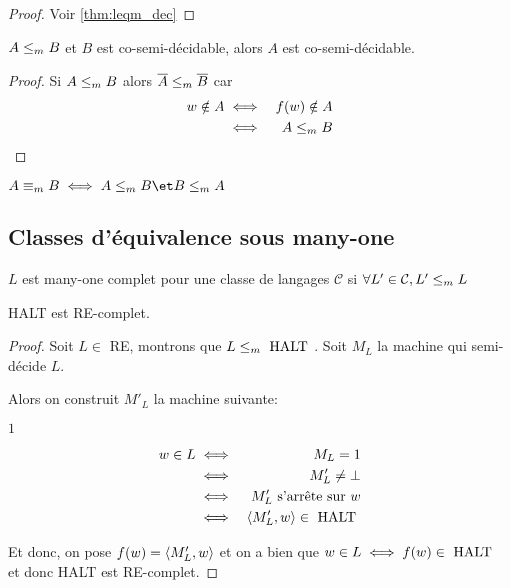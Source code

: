 \begin{proof}
	Voir \ref{thm:leqm_dec}
\end{proof}

\begin{theorem}
	$A \leq_m B$ et $B$ est co-semi-décidable, alors $A$ est co-semi-décidable.
\end{theorem}

\begin{proof}
	Si $A \leq_m B$ alors $\overline A \leq_m \overline B$ car
	\begin{eqnarray*}
		w \notin A &\iff& f(w) \notin A \\
		&\iff& A \leq_m B
	\end{eqnarray*}
\end{proof}

\begin{definition}
	$A \equivm B \iff A \leqm B \et B \leqm A$
\end{definition}

\subsection{Classes d'équivalence sous many-one}

\begin{definition}
	$L$ est many-one complet pour une classe de langages $\mathcal C$ si $\forall L' \in \mathcal C, L' \leq_m L$
\end{definition}

\begin{prop}
	HALT est RE-complet.
\end{prop}

\begin{proof}
	Soit $L \in $ RE, montrons que $L \leq_m \text{ HALT }$. Soit $M_L$ la machine qui semi-décide $L$.

	Alors on construit $M'_L$ la machine suivante:
	\begin{algorithmic}[lines]
		 {$1$}
		\Else { $\bot$}
		\EndIf
		\EndFunction
	\end{algorithmic}

	\begin{eqnarray*}
		w \in L &\iff& M_L = 1 \\
		&\iff& M'_L \neq \bot \\
		&\iff& M'_L \text{ s'arrête sur } w\\
		&\iff& \left\langle M'_L,w\right\rangle \in \text{ HALT }
	\end{eqnarray*}

	Et donc, on pose $f (w) = \left\langle M'_L,w\right\rangle$ et on a bien que
	$w \in L \iff f(w) \in \text{ HALT }$ et donc HALT est RE-complet.
\end{proof}

